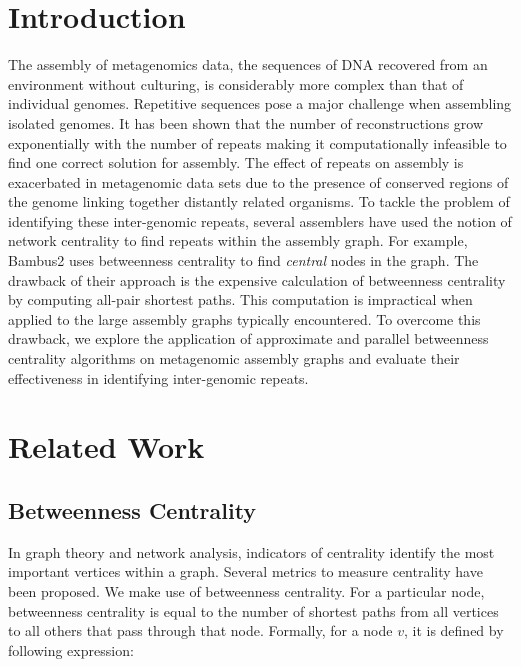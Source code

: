 \documentclass[runningheads,a4paper]{llncs}
\begin{document}
\section{Introduction}

The assembly of metagenomics data, the sequences of DNA recovered from an environment without culturing, is considerably more complex than that of individual genomes.
Repetitive sequences pose a major challenge when assembling isolated genomes.
It has been shown that the number of reconstructions grow exponentially with the number of repeats making it computationally infeasible to find one correct solution for assembly\cite{kingsford}.
The effect of repeats on assembly is exacerbated in metagenomic data sets due to the presence of conserved regions of the genome linking together distantly related organisms.
To tackle the problem of identifying these inter-genomic repeats, several assemblers have used the notion of network centrality to find repeats within the assembly graph.
For example, Bambus2\cite{bambus} uses betweenness centrality to find \emph{central} nodes in the graph.
The drawback of their approach is the expensive calculation of betweenness centrality by computing all-pair shortest paths.
This computation is impractical when applied to the large assembly graphs typically encountered.
To overcome this drawback, we explore the application of approximate and parallel betweenness centrality algorithms on metagenomic assembly graphs and evaluate their effectiveness in identifying inter-genomic repeats.

\section{Related Work}

\subsection*{Betweenness Centrality}
In graph theory and network analysis, indicators of centrality identify the most important vertices within a graph. Several metrics to measure centrality have been proposed. We make use of betweenness centrality. For a particular node, betweenness centrality is equal to the number of shortest paths from all vertices to all others that pass through that node. Formally, for a node $v$, it is defined by following expression:
\end{document}
